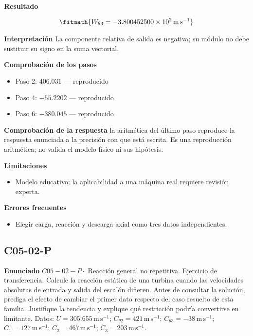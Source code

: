 \documentclass[10pt,openany]{book}
\begin{document}
\noindent\textbf{Resultado}

\[
\fitmath{W_{\theta 3}=-3.800452500\times10^{2}\,\mathrm{m}\,\mathrm{s}^{-1}}
\]

\noindent\textbf{Interpretación}
La componente relativa de salida es negativa; su módulo no debe sustituir su signo en la suma vectorial.

\noindent\textbf{Comprobación de los pasos}
\begin{itemize}
\item Paso 2: $406.031$ — reproducido
\item Paso 4: $-55.2202$ — reproducido
\item Paso 6: $-380.045$ — reproducido
\end{itemize}

\noindent\textbf{Comprobación de la respuesta} la aritmética del último paso reproduce la respuesta enunciada a la precisión con que está escrita. Es una reproducción aritmética; no valida el modelo físico ni sus hipótesis.

\noindent\textbf{Limitaciones}
\begin{itemize}
\item Modelo educativo; la aplicabilidad a una máquina real requiere revisión experta.
\end{itemize}

\noindent\textbf{Errores frecuentes}
\begin{itemize}
\item Elegir carga, reacción y descarga axial como tres datos independientes.
\end{itemize}
\subsection*{C05-02-P}

\noindent\textbf{Enunciado}
\(C05-02-P \cdot\) Reacción general no repetitiva. Ejercicio de transferencia. Calcule la reacción estática de una turbina cuando las velocidades absolutas de entrada y salida del escalón difieren. Antes de consultar la solución, prediga el efecto de cambiar el primer dato respecto del caso resuelto de esta familia. Justifique la tendencia y explique qué restricción podría convertirse en limitante. Datos: \(U=305.655\, \mathrm{m}\,\mathrm{s}^{-1}\); \(C_{\theta2}=421\, \mathrm{m}\,\mathrm{s}^{-1}\); \(C_{\theta3}=-38\, \mathrm{m}\,\mathrm{s}^{-1}\); \(C_1=127\, \mathrm{m}\,\mathrm{s}^{-1}\); \(C_2=467\, \mathrm{m}\,\mathrm{s}^{-1}\); \(C_3=203\, \mathrm{m}\,\mathrm{s}^{-1}\).
\end{document}
